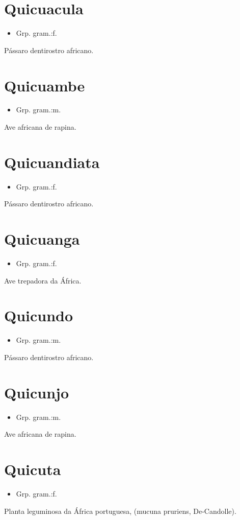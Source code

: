 \section{Quicuacula}
\begin{itemize}
\item {Grp. gram.:f.}
\end{itemize}
Pássaro dentirostro africano.
\section{Quicuambe}
\begin{itemize}
\item {Grp. gram.:m.}
\end{itemize}
Ave africana de rapina.
\section{Quicuandiata}
\begin{itemize}
\item {Grp. gram.:f.}
\end{itemize}
Pássaro dentirostro africano.
\section{Quicuanga}
\begin{itemize}
\item {Grp. gram.:f.}
\end{itemize}
Ave trepadora da África.
\section{Quicundo}
\begin{itemize}
\item {Grp. gram.:m.}
\end{itemize}
Pássaro dentirostro africano.
\section{Quicunjo}
\begin{itemize}
\item {Grp. gram.:m.}
\end{itemize}
Ave africana de rapina.
\section{Quicuta}
\begin{itemize}
\item {Grp. gram.:f.}
\end{itemize}
Planta leguminosa da África portuguesa, (\textunderscore mucuna pruriens\textunderscore , De-Candolle).
